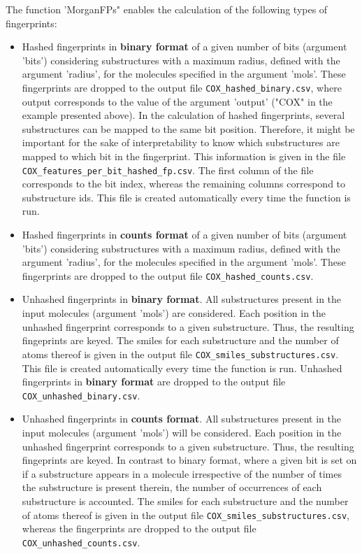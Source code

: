 \documentclass[twoside,a4wide,12pt]{article}\usepackage[]{graphicx}\usepackage[]{color}
\begin{document}
The function 'MorganFPs" enables the calculation of the following types of fingerprints:
\begin{itemize}

\item Hashed fingerprints in {\bf binary format} of a given number of bits (argument 'bits') considering substructures with a maximum radius, defined with the argument 'radius', for the molecules specified in the argument 'mols'. These fingerprints are dropped to the output file \verb|COX_hashed_binary.csv|, where output corresponds to the value of the argument 'output' ("COX" in the example presented above). 
In the calculation of hashed fingerprints, several substructures can be mapped to the same bit position.
Therefore, it might be important for the sake of interpretability to know which substructures are mapped to which bit in the fingerprint. This information is given in the file \verb|COX_features_per_bit_hashed_fp.csv|.
The first column of the file corresponds to the bit index, whereas the remaining columns correspond to substructure ids.
This file is created automatically every time the function is run.

\item Hashed fingerprints in {\bf counts format} of a given number of bits (argument 'bits') considering substructures with a maximum radius, defined with the argument 'radius', for the molecules specified in the argument 'mols'. These fingerprints are dropped to the output file \verb|COX_hashed_counts.csv|.

\item Unhashed fingerprints in {\bf binary format}. All substructures present in the input molecules (argument 'mols') are considered. Each position in the unhashed fingerprint corresponds to a given substructure. Thus, the resulting fingeprints are keyed. The smiles for each substructure and the number of atoms thereof is given in the output file \verb|COX_smiles_substructures.csv|. This file is created automatically every time the function is run. 
Unhashed fingerprints in {\bf binary format} are dropped to the output file \verb|COX_unhashed_binary.csv|.

\item Unhashed fingerprints in {\bf counts format}. All substructures present in the input molecules (argument 'mols') will be considered. Each position in the unhashed fingerprint corresponds to a given substructure. Thus, the resulting fingeprints are keyed. In contrast to binary format, where a given bit is set on if a substructure appears in a molecule irrespective of the number of times the substructure is present therein, the number of occurrences of each substructure is accounted. The smiles for each substructure and the number of atoms thereof is given in the output file \verb|COX_smiles_substructures.csv|,  whereas the fingerprints are dropped to the output file \verb|COX_unhashed_counts.csv|.


\end{itemize}
\end{document}
